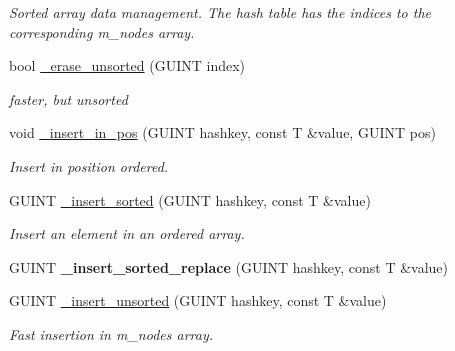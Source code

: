 \begin{DoxyCompactItemize}
\begin{DoxyCompactList}\small\item\em Sorted array data management. The hash table has the indices to the corresponding m\+\_\+nodes array. \end{DoxyCompactList}\item 
\mbox{\label{classgim__hash__table_a0b68afa191499a10ac7d7c34230a7d89}} 
bool \hyperlink{classgim__hash__table_a0b68afa191499a10ac7d7c34230a7d89}{\+\_\+erase\+\_\+unsorted} (G\+U\+I\+NT index)
\begin{DoxyCompactList}\small\item\em faster, but unsorted \end{DoxyCompactList}\item 
void \hyperlink{classgim__hash__table_a3eacaf88e1b18815c0b89d368d77a93a}{\+\_\+insert\+\_\+in\+\_\+pos} (G\+U\+I\+NT hashkey, const T \&value, G\+U\+I\+NT pos)
\begin{DoxyCompactList}\small\item\em Insert in position ordered. \end{DoxyCompactList}\item 
\mbox{\label{classgim__hash__table_a66d18cb60b0628a9aa759304395f4825}} 
G\+U\+I\+NT \hyperlink{classgim__hash__table_a66d18cb60b0628a9aa759304395f4825}{\+\_\+insert\+\_\+sorted} (G\+U\+I\+NT hashkey, const T \&value)
\begin{DoxyCompactList}\small\item\em Insert an element in an ordered array. \end{DoxyCompactList}\item 
\mbox{\label{classgim__hash__table_ac221e1462f7711085b1260fc229b6183}} 
G\+U\+I\+NT {\bfseries \+\_\+insert\+\_\+sorted\+\_\+replace} (G\+U\+I\+NT hashkey, const T \&value)
\item 
\mbox{\label{classgim__hash__table_a95f93f63d75663f494388dc03423332f}} 
G\+U\+I\+NT \hyperlink{classgim__hash__table_a95f93f63d75663f494388dc03423332f}{\+\_\+insert\+\_\+unsorted} (G\+U\+I\+NT hashkey, const T \&value)
\begin{DoxyCompactList}\small\item\em Fast insertion in m\+\_\+nodes array. \end{DoxyCompactList}\end{DoxyCompactItemize}

